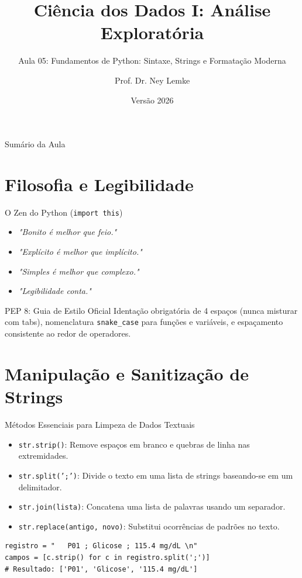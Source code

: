\documentclass[aspectratio=169, 10pt]{beamer}
\title[Aula 05 - Fundamentos de Python]{Ciência dos Dados I: Análise Exploratória}
\subtitle{Aula 05: Fundamentos de Python: Sintaxe, Strings e Formatação Moderna}
\author{Prof. Dr. Ney Lemke}
\institute{UNESP -- Instituto de Biociências de Botucatu}
\date{Versão 2026}
\begin{document}
\frame{\titlepage}

\begin{frame}{Sumário da Aula}
  \tableofcontents
\end{frame}

\section{Filosofia e Legibilidade}

\begin{frame}{O Zen do Python (\texttt{import this})}
  \begin{itemize}
    \item \textit{"Bonito é melhor que feio."}
    \item \textit{"Explícito é melhor que implícito."}
    \item \textit{"Simples é melhor que complexo."}
    \item \textit{"Legibilidade conta."}
  \end{itemize}
  \begin{block}{PEP 8: Guia de Estilo Oficial}
    Identação obrigatória de 4 espaços (nunca misturar com tabs), nomenclatura \texttt{snake\_case} para funções e variáveis, e espaçamento consistente ao redor de operadores.
  \end{block}
\end{frame}

\section{Manipulação e Sanitização de Strings}

\begin{frame}[fragile]{Métodos Essenciais para Limpeza de Dados Textuais}
  \begin{itemize}
    \item \texttt{str.strip()}: Remove espaços em branco e quebras de linha nas extremidades.
    \item \texttt{str.split(';')}: Divide o texto em uma lista de strings baseando-se em um delimitador.
    \item \texttt{str.join(lista)}: Concatena uma lista de palavras usando um separador.
    \item \texttt{str.replace(antigo, novo)}: Substitui ocorrências de padrões no texto.
  \end{itemize}
  \begin{lstlisting}
registro = "   P01 ; Glicose ; 115.4 mg/dL \n"
campos = [c.strip() for c in registro.split(';')]
# Resultado: ['P01', 'Glicose', '115.4 mg/dL']
  \end{lstlisting}
\end{frame}
\end{document}
